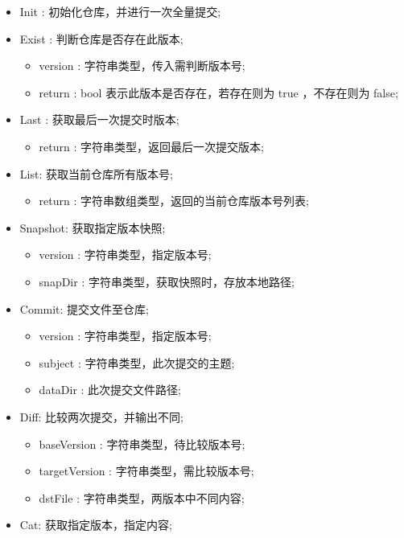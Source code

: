 \documentclass{utart}
\begin{document}
\begin{itemize}[leftmargin=4em]
  \item Init : 初始化仓库，并进行一次全量提交;
  \item Exist : 判断仓库是否存在此版本;
  \begin{itemize}[leftmargin=4em]
    \item version : 字符串类型，传入需判断版本号;
    \item return : bool 表示此版本是否存在，若存在则为 true ，不存在则为 false;
  \end{itemize}  
  \item Last : 获取最后一次提交时版本;
  \begin{itemize}[leftmargin=4em]
    \item return : 字符串类型，返回最后一次提交版本;
  \end{itemize} 
  \item List: 获取当前仓库所有版本号;
  \begin{itemize}[leftmargin=4em]
    \item return : 字符串数组类型，返回的当前仓库版本号列表;
  \end{itemize} 
  \item Snapshot: 获取指定版本快照;
  \begin{itemize}[leftmargin=4em]
    \item version : 字符串类型，指定版本号;
    \item snapDir : 字符串类型，获取快照时，存放本地路径;
  \end{itemize} 
  \item Commit: 提交文件至仓库;
  \begin{itemize}[leftmargin=4em]
    \item version : 字符串类型，指定版本号;
    \item subject : 字符串类型，此次提交的主题;
    \item dataDir : 此次提交文件路径;
  \end{itemize}   
  \item Diff: 比较两次提交，并输出不同;
  \begin{itemize}[leftmargin=4em]
    \item baseVersion : 字符串类型，待比较版本号;
    \item targetVersion : 字符串类型，需比较版本号;
    \item dstFile : 字符串类型，两版本中不同内容;
  \end{itemize} 
  \item Cat: 获取指定版本，指定内容;
  \begin{itemize}[leftmargin=4em]

\end{itemize}
\end{itemize}
\end{document}
